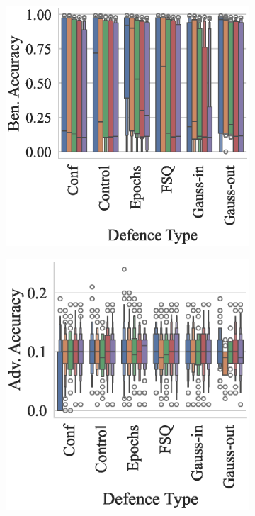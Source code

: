 \begin{figure}
\begin{subfigure}[]{0.27\textwidth}
    \centering
    \includegraphics[width=\textwidth]{mnist/ben_accuracy_vs_defence_type.eps}
\end{subfigure}
\begin{subfigure}[]{0.27\textwidth}
    \centering
    \includegraphics[width=\textwidth]{mnist/adv_accuracy_vs_defence_type.eps}

\end{subfigure}
\end{figure}
